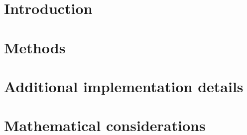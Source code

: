 \documentclass[a4paper,11pt,twoside,openany,british]{book}
\begin{document}
\frontmatter

\tableofcontents

\mainmatter
\chapter{Introduction}

\chapter{Methods}



\appendix
\chapter{Additional implementation details}

\chapter{Mathematical considerations}


\backmatter
\printbibliography[heading=bibintoc]
\printnoidxglossary[type=definitions]
\printnoidxglossary[type=\acronymtype,nonumberlist]
\printnoidxglossary[type=symbols,nonumberlist]
\glsaddallunused[symbols]
\end{document}
